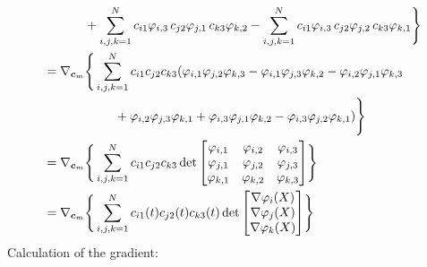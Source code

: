 \begin{align}
    &\hspace{11.5mm}+\sumlim{i,j,k=1}{N}{c_{i1} \varphi_{i,3} \, c_{j2} \varphi_{j,1} \, c_{k3}\varphi_{k,2}}
    -\sumlim{i,j,k=1}{N}{c_{i1} \varphi_{i,3} \, c_{j2} \varphi_{j,2} \, c_{k3}\varphi_{k,1}} 
    \Bigg\}\nonumber\\
  &=\nabla_{\Bc_m}\Bigg\{
    \sumlim{i,j,k=1}{N}{
    c_{i1} c_{j2} c_{k3} (
      \varphi_{i,1} \varphi_{j,2} \varphi_{k,3}-\varphi_{i,1} \varphi_{j,3} \varphi_{k,2}-\varphi_{i,2} \varphi_{j,1} \varphi_{k,3}
      }\nonumber\\
      &\hspace{20mm}+\varphi_{i,2} \varphi_{j,3} \varphi_{k,1}+\varphi_{i,3} \varphi_{j,1} \varphi_{k,2}
      -\varphi_{i,3} \varphi_{j,2} \varphi_{k,1} )
    \Bigg\}\nonumber\\
  &=\nabla_{\Bc_m}\Bigg\{
      \sumlim{i,j,k=1}{N}{
      c_{i1} c_{j2} c_{k3} 
      \det  \begin{bmatrix}
              \varphi_{i,1} & \varphi_{i,2} & \varphi_{i,3} \\
              \varphi_{j,1} & \varphi_{j,2} & \varphi_{j,3} \\
              \varphi_{k,1} & \varphi_{k,2} & \varphi_{k,3}
            \end{bmatrix}
      }
    \Bigg\} \nonumber\\
  &=\nabla_{\Bc_m}\Bigg\{
      \sumlim{i,j,k=1}{N}{
      c_{i1}(t) c_{j2}(t) c_{k3}(t)
      \det \begin{bmatrix}
              \nabla \varphi_{i}(X) \\
              \nabla \varphi_{j}(X) \\
              \nabla \varphi_{k}(X)
            \end{bmatrix}
      }
    \Bigg\}
\end{align}
%
\newpage
%
Calculation of the gradient:
